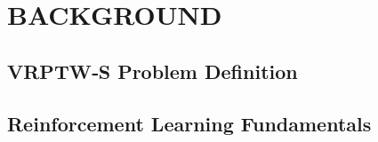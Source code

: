 \documentclass[final,11pt,times]{elsarticle}
\begin{document}



\section{BACKGROUND}
\label{sec:background}

\subsection{VRPTW‑S Problem Definition}


\subsection{Reinforcement Learning Fundamentals}

\end{document}
